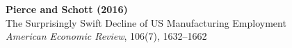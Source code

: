 \documentclass[12pt]{article}
\begin{document}
\begin{center}
{\Large\bfseries Pierce and Schott (2016)}\\
{\large The Surprisingly Swift Decline of US Manufacturing Employment}\\
\vspace{0.5em}
{\normalsize \textit{American Economic Review}, 106(7), 1632--1662}
\end{center}

\vspace{1em}




\end{document}
